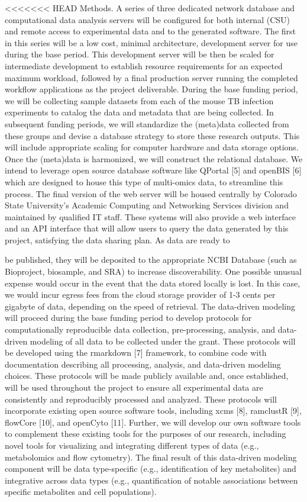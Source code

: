 \documentclass[]{book}
\begin{document}
<<<<<<< HEAD
Methods. A series of three dedicated network database and computational
data analysis servers will be configured for both internal (CSU) and
remote access to experimental data and to the generated software. The
first in this series will be a low cost, minimal architecture,
development server for use during the base period. This development
server will be then be scaled for intermediate development to establish
resource requirements for an expected maximum workload, followed by a
final production server running the completed workflow applications as
the project deliverable. During the base funding period, we will be
collecting sample datasets from each of the mouse TB infection
experiments to catalog the data and metadata that are being collected.
In subsequent funding periods, we will standardize the (meta)data
collected from these groups and devise a database strategy to store
these research outputs. This will include appropriate scaling for
computer hardware and data storage options. Once the (meta)data is
harmonized, we will construct the relational database. We intend to
leverage open source database software like QPortal {[}5{]} and openBIS
{[}6{]} which are designed to house this type of multi-omics data, to
streamline this process. The final version of the web server will be
housed centrally by Colorado State University's Academic Computing and
Networking Services division and maintained by qualified IT staff. These
systems will also provide a web interface and an API interface that will
allow users to query the data generated by this project, satisfying the
data sharing plan. As data are ready to

be published, they will be deposited to the appropriate NCBI Database
(such as Bioproject, biosample, and SRA) to increase discoverability.
One possible unusual expense would occur in the event that the data
stored locally is lost. In this case, we would incur egress fees from
the cloud storage provider of 1-3 cents per gigabyte of data, depending
on the speed of retrieval. The data-driven modeling will proceed during
the base funding period to develop protocols for computationally
reproducible data collection, pre-processing, analysis, and data-driven
modeling of all data to be collected under the grant. These protocols
will be developed using the rmarkdown {[}7{]} framework, to combine code
with documentation describing all processing, analysis, and data-driven
modeling choices. These protocols will be made publicly available and,
once established, will be used throughout the project to ensure all
experimental data are consistently and reproducibly processed and
analyzed. These protocols will incorporate existing open source software
tools, including xcms {[}8{]}, ramclustR {[}9{]}, flowCore {[}10{]}, and
openCyto {[}11{]}. Further, we will develop our own software tools to
complement these existing tools for the purposes of our research,
including novel tools for visualizing and integrating different types of
data (e.g., metabolomics and flow cytometry). The final result of this
data-driven modeling component will be data type-specific (e.g.,
identification of key metabolites) and integrative across data types
(e.g., quantification of notable associations between specific
metabolites and cell populations).
\end{document}
